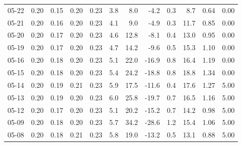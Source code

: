 \begin{threeparttable}
{\begin{tabular}{lrrrrrrrrrrr}
  05-22 &          0.20 &          0.15 &          0.20 &        0.23 &                 3.8 &                 8.0 &       -4.2 &                 0.3 &              8.7 &            0.64 &                   0.00 \\
  05-21 &          0.20 &          0.16 &          0.20 &        0.23 &                 4.1 &                 9.0 &       -4.9 &                 0.3 &             11.7 &            0.85 &                   0.00 \\
  05-20 &          0.20 &          0.17 &          0.20 &        0.23 &                 4.6 &                12.8 &       -8.1 &                 0.4 &             13.0 &            0.95 &                   0.00 \\
  05-19 &          0.20 &          0.17 &          0.20 &        0.23 &                 4.7 &                14.2 &       -9.6 &                 0.5 &             15.3 &            1.10 &                   0.00 \\
  05-16 &          0.20 &          0.18 &          0.20 &        0.23 &                 5.1 &                22.0 &      -16.9 &                 0.8 &             16.4 &            1.19 &                   0.00 \\
  05-15 &          0.20 &          0.18 &          0.20 &        0.23 &                 5.4 &                24.2 &      -18.8 &                 0.8 &             18.8 &            1.34 &                   0.00 \\
  05-14 &          0.20 &          0.19 &          0.21 &        0.23 &                 5.9 &                17.5 &      -11.6 &                 0.4 &             17.6 &            1.27 &                   5.00 \\
  05-13 &          0.20 &          0.19 &          0.20 &        0.23 &                 6.0 &                25.8 &      -19.7 &                 0.7 &             16.5 &            1.16 &                   5.00 \\
  05-12 &          0.20 &          0.17 &          0.20 &        0.23 &                 5.1 &                20.2 &      -15.2 &                 0.7 &             14.2 &            0.98 &                   5.00 \\
  05-09 &          0.20 &          0.18 &          0.20 &        0.23 &                 5.7 &                34.2 &      -28.6 &                 1.2 &             15.4 &            1.06 &                   5.00 \\
  05-08 &          0.20 &          0.18 &          0.21 &        0.23 &                 5.8 &                19.0 &      -13.2 &                 0.5 &             13.1 &            0.88 &                   5.00 \\

\end{tabular}}
\end{threeparttable}
